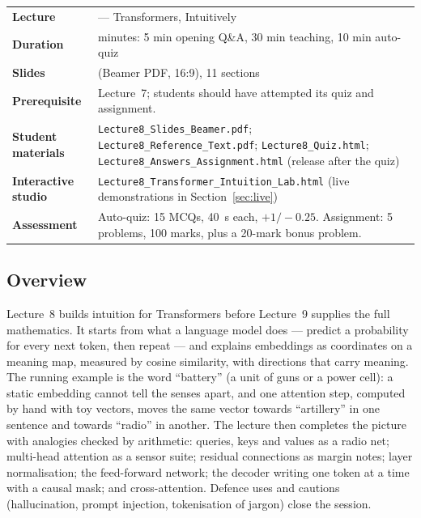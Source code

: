\documentclass[11pt]{article}
\begin{document}
\begin{center}\small\renewcommand{\arraystretch}{1.25}\begin{tabularx}{\textwidth}{@{}>{\bfseries}p{3.3cm}>{\raggedright\arraybackslash}X@{}}\toprule

\textcolor{NavyN}{Lecture}&8 --- Transformers, Intuitively\\
\textcolor{NavyN}{Duration}&45 minutes: 5 min opening Q\&A, 30 min teaching, 10 min auto-quiz\\
\textcolor{NavyN}{Slides}&33 (Beamer PDF, 16:9), 11 sections\\
\textcolor{NavyN}{Prerequisite}&Lecture~7; students should have attempted its quiz and assignment.\\
\textcolor{NavyN}{Student materials}&\texttt{Lecture8\_Slides\_Beamer.pdf}; \texttt{Lecture8\_Reference\_Text.pdf}; \texttt{Lecture8\_Quiz.html}; \texttt{Lecture8\_Answers\_Assignment.html} (release after the quiz)\\
\textcolor{NavyN}{Interactive studio}&\texttt{Lecture8\_Transformer\_Intuition\_Lab.html} (live demonstrations in Section~\ref{sec:live})\\
\textcolor{NavyN}{Assessment}&Auto-quiz: 15 MCQs, 40~s each, $+1/-0.25$. Assignment: 5 problems, 100 marks, plus a 20-mark bonus problem.\\\bottomrule\end{tabularx}\end{center}

\subsection*{Overview}Lecture~8 builds intuition for Transformers before Lecture~9 supplies the full mathematics. It starts from what a language model does --- predict a probability for every next token, then repeat --- and explains embeddings as coordinates on a meaning map, measured by cosine similarity, with directions that carry meaning. The running example is the word ``battery'' (a unit of guns or a power cell): a static embedding cannot tell the senses apart, and one attention step, computed by hand with toy vectors, moves the same vector towards ``artillery'' in one sentence and towards ``radio'' in another. The lecture then completes the picture with analogies checked by arithmetic: queries, keys and values as a radio net; multi-head attention as a sensor suite; residual connections as margin notes; layer normalisation; the feed-forward network; the decoder writing one token at a time with a causal mask; and cross-attention. Defence uses and cautions (hallucination, prompt injection, tokenisation of jargon) close the session.
\end{document}
